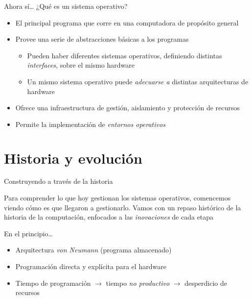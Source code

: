 \documentclass[presentation]{beamer}
\begin{document}
\begin{frame}[label={sec:orgdeec494}]{Ahora sí… ¿Qué es un sistema operativo?}
\begin{itemize}
\item El principal programa que corre en una computadora de propósito
general
\item Provee una serie de abstracciones básicas a los programas
\begin{itemize}
\item Pueden haber diferentes sistemas operativos, definiendo distintas
\emph{interfaces}, sobre el mismo hardware
\item Un mismo sistema operativo puede \emph{adecuarse a} distintas
arquitecturas de hardware
\end{itemize}
\item Ofrece una infraestructura de gestión, aislamiento y protección de
recursos
\item Permite la implementación de \emph{entornos operativos}
\end{itemize}
\end{frame}

\section{Historia y evolución}
\label{sec:org4a27faf}

\begin{frame}[label={sec:org219a62d}]{Construyendo a través de la historia}
\begin{center}
Para comprender lo que hoy gestionan los sistemas operativos,
comencemos viendo cómo es que llegaron a gestionarlo.
\vfill
Vamos con un repaso histórico de la historia de la computación,
enfocados a las \emph{inovaciones} de cada etapa
\end{center}
\end{frame}

\begin{frame}[label={sec:org2dee163}]{En el principio…}
\begin{itemize}
\item Arquitectura \emph{von Neumann} (programa almacenado)
\item Programación directa y explícita para el hardware
\item Tiempo de programación \(\rightarrow\) tiempo \emph{no productivo}
\(\rightarrow\) desperdicio de recursos
\end{itemize}
\end{frame}
\end{document}
